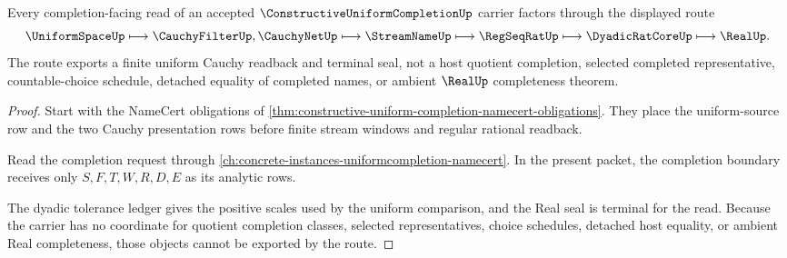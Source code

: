 \begin{theorem}
\label{thm:constructive-uniform-completion-uniform-route}
Every completion-facing read of an accepted $\ConstructiveUniformCompletionUp$ carrier factors through the displayed route
$$
\UniformSpaceUp \longmapsto \CauchyFilterUp,\CauchyNetUp \longmapsto \StreamNameUp \longmapsto \RegSeqRatUp \longmapsto \DyadicRatCoreUp \longmapsto \RealUp .
$$
The route exports a finite uniform Cauchy readback and terminal seal, not a host quotient completion, selected completed representative, countable-choice schedule, detached equality of completed names, or ambient $\RealUp$ completeness theorem.
\end{theorem}
\begin{proof}
Start with the NameCert obligations of \autoref{thm:constructive-uniform-completion-namecert-obligations}. They place the uniform-source row and the two Cauchy presentation rows before finite stream windows and regular rational readback.

Read the completion request through \autoref{ch:concrete-instances-uniformcompletion-namecert}. In the present packet, the completion boundary receives only $S,F,T,W,R,D,E$ as its analytic rows.

The dyadic tolerance ledger gives the positive scales used by the uniform comparison, and the Real seal is terminal for the read. Because the carrier has no coordinate for quotient completion classes, selected representatives, choice schedules, detached host equality, or ambient Real completeness, those objects cannot be exported by the route.
\end{proof}

